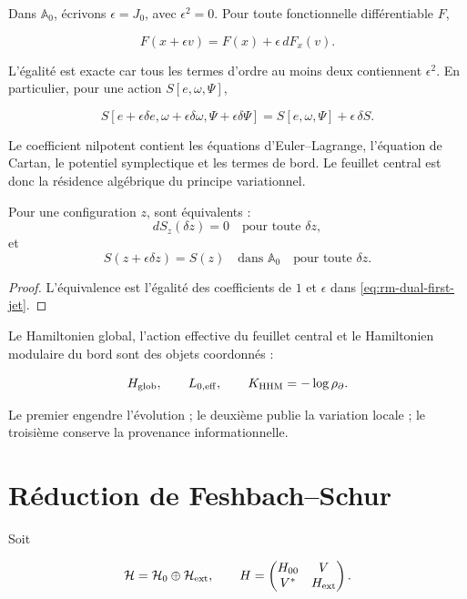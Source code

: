 Dans \(\mathbb A_0\), écrivons \(\epsilon=J_0\), avec \(\epsilon^2=0\). Pour
toute fonctionnelle différentiable \(F\),

\begin{equation}
\boxed{F(x+\epsilon v)=F(x)+\epsilon\,dF_x(v).}
\label{eq:rm-dual-first-jet}
\end{equation}

L'égalité est exacte car tous les termes d'ordre au moins deux
contiennent \(\epsilon^2\). En particulier, pour une action
\(S[e,\omega,\Psi]\),

\begin{equation}
S[e+\epsilon\delta e,\omega+\epsilon\delta\omega,
  \Psi+\epsilon\delta\Psi]
=S[e,\omega,\Psi]+\epsilon\,\delta S.
\label{eq:rm-action-first-jet}
\end{equation}

Le coefficient nilpotent contient les équations d'Euler--Lagrange,
l'équation de Cartan, le potentiel symplectique et les termes de bord.
Le feuillet central est donc la résidence algébrique du principe
variationnel.

\begin{theorem}
Pour une configuration \(z\), sont équivalents :
\[
dS_z(\delta z)=0\quad\text{pour toute }\delta z,
\]
et
\[
S(z+\epsilon\delta z)=S(z)
\quad\text{dans }\mathbb A_0
\quad\text{pour toute }\delta z.
\]
\end{theorem}

\begin{proof}
L'équivalence est l'égalité des coefficients de \(1\) et \(\epsilon\) dans
\eqref{eq:rm-dual-first-jet}.
\end{proof}

Le Hamiltonien global, l'action effective du feuillet central et le
Hamiltonien modulaire du bord sont des objets coordonnés :

\[
H_{\rm glob},
\qquad
L_{0,\rm eff},
\qquad
K_{\rm HHM}=-\log\rho_{\partial}.
\]

Le premier engendre l'évolution ; le deuxième publie la variation locale ; le
troisième conserve la provenance informationnelle.

\section{Réduction de Feshbach--Schur}

Soit

\[
\mathcal H=\mathcal H_0\oplus\mathcal H_{\rm ext},
\qquad
H=
\begin{pmatrix}
H_{00}&V\\ V^*&H_{\rm ext}
\end{pmatrix}.
\]

